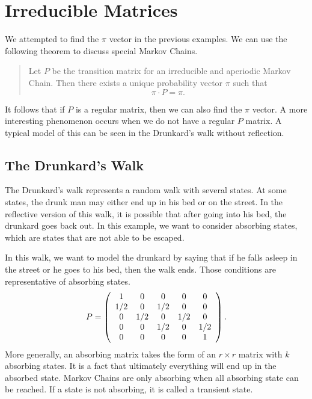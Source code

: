 \documentclass{hw}
\begin{document}
\section*{Irreducible Matrices}
We attempted to find the $\pi$ vector in the previous examples. We can use the following theorem to
discuss special Markov Chains.
\begin{quote}
Let $P$ be the transition matrix for an irreducible and aperiodic Markov Chain. Then there exists
a unique probability vector $\pi$ such that
\[
\pi\cdot P=\pi.
\]
\end{quote}
It follows that if $P$ is a regular matrix, then we can also find the $\pi$ vector. A more
interesting phenomenon occurs when we do not have a regular $P$ matrix. A typical model of this can
be seen in the Drunkard's walk without reflection.

\subsection*{The Drunkard's Walk}
The Drunkard's walk represents a random walk with several states. At some states, the drunk man may
either end up in his bed or on the street. In the reflective version of this walk, it is possible that
after going into his bed, the drunkard goes back out. In this example, we want to consider absorbing
states, which are states that are not able to be escaped.

In this walk, we want to model the drunkard by saying that if he falls asleep in the street or he
goes to his bed, then the walk ends. Those conditions are representative of absorbing states.
\[
P=
\left(
\begin{array}{c c c c c}
1 & 0 & 0 & 0 & 0\\
1/2 & 0 & 1/2 & 0 & 0\\
0 & 1/2 & 0 & 1/2 & 0\\
0 & 0 & 1/2 & 0 & 1/2\\
0 & 0 & 0 & 0 & 1
\end{array}
\right).
\]
More generally, an absorbing matrix takes the form of an $r\times r$ matrix with $k$ absorbing
states. It is a fact that ultimately everything will end up in the absorbed state. Markov Chains
are only absorbing when all absorbing state can be reached. If a state is not absorbing, it is
called a transient state.
\end{document}
